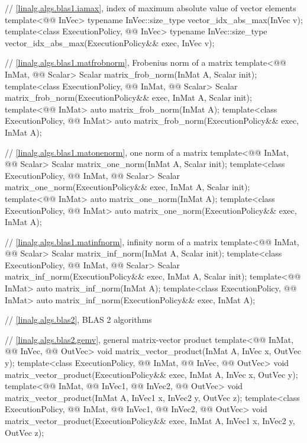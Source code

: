 \begin{codeblock}
{  // \ref{linalg.algs.blas1.iamax}, index of maximum absolute value of vector elements
  template<@@ InVec>
    typename InVec::size_type vector_idx_abs_max(InVec v);
  template<class ExecutionPolicy, @@ InVec>
    typename InVec::size_type vector_idx_abs_max(ExecutionPolicy&& exec, InVec v);

  // \ref{linalg.algs.blas1.matfrobnorm}, Frobenius norm of a matrix
  template<@@ InMat, @@ Scalar>
    Scalar matrix_frob_norm(InMat A, Scalar init);
  template<class ExecutionPolicy, @@ InMat, @@ Scalar>
    Scalar matrix_frob_norm(ExecutionPolicy&& exec, InMat A, Scalar init);
  template<@@ InMat>
    auto matrix_frob_norm(InMat A);
  template<class ExecutionPolicy, @@ InMat>
    auto matrix_frob_norm(ExecutionPolicy&& exec, InMat A);

  // \ref{linalg.algs.blas1.matonenorm}, one norm of a matrix
  template<@@ InMat, @@ Scalar>
    Scalar matrix_one_norm(InMat A, Scalar init);
  template<class ExecutionPolicy, @@ InMat, @@ Scalar>
    Scalar matrix_one_norm(ExecutionPolicy&& exec, InMat A, Scalar init);
  template<@@ InMat>
    auto matrix_one_norm(InMat A);
  template<class ExecutionPolicy, @@ InMat>
    auto matrix_one_norm(ExecutionPolicy&& exec, InMat A);

  // \ref{linalg.algs.blas1.matinfnorm}, infinity norm of a matrix
  template<@@ InMat, @@ Scalar>
    Scalar matrix_inf_norm(InMat A, Scalar init);
  template<class ExecutionPolicy, @@ InMat, @@ Scalar>
    Scalar matrix_inf_norm(ExecutionPolicy&& exec, InMat A, Scalar init);
  template<@@ InMat>
    auto matrix_inf_norm(InMat A);
  template<class ExecutionPolicy, @@ InMat>
    auto matrix_inf_norm(ExecutionPolicy&& exec, InMat A);

  // \ref{linalg.algs.blas2}, BLAS 2 algorithms

  // \ref{linalg.algs.blas2.gemv}, general matrix-vector product
  template<@@ InMat, @@ InVec, @@ OutVec>
    void matrix_vector_product(InMat A, InVec x, OutVec y);
  template<class ExecutionPolicy, @@ InMat, @@ InVec, @@ OutVec>
    void matrix_vector_product(ExecutionPolicy&& exec, InMat A, InVec x, OutVec y);
  template<@@ InMat, @@ InVec1, @@ InVec2, @@ OutVec>
    void matrix_vector_product(InMat A, InVec1 x, InVec2 y, OutVec z);
  template<class ExecutionPolicy,
           @@ InMat, @@ InVec1, @@ InVec2, @@ OutVec>
    void matrix_vector_product(ExecutionPolicy&& exec, InMat A, InVec1 x, InVec2 y, OutVec z);

}
\end{codeblock}
